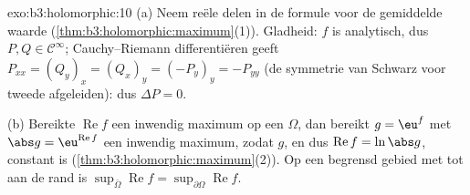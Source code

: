 \begin{solution}{exo:b3:holomorphic:10}
(a) Neem reële delen in de formule voor de gemiddelde waarde
(\cref{thm:b3:holomorphic:maximum}(1)). Gladheid: $f$ is
analytisch, dus $P, Q \in \mathcal C^\infty$; Cauchy--Riemann
differentiëren geeft $P_{xx} = (Q_y)_x = (Q_x)_y = (-P_y)_y =
-P_{yy}$ (de symmetrie van Schwarz voor tweede afgeleiden): dus
$\Delta P = 0$.

(b) Bereikte $\operatorname{Re}f$ een inwendig maximum op een
 $\Omega$, dan bereikt $g = \eu^f$ met $\abs g =
\eu^{\operatorname{Re}f}$ een inwendig maximum, zodat $g$, en dus
$\operatorname{Re}f = \ln\abs g$, constant is
(\cref{thm:b3:holomorphic:maximum}(2)). Op een begrensd gebied
met  tot aan de rand is
$\sup_{\bar\Omega}\operatorname{Re}f =
\sup_{\partial\Omega}\operatorname{Re}f$.
\end{solution}

